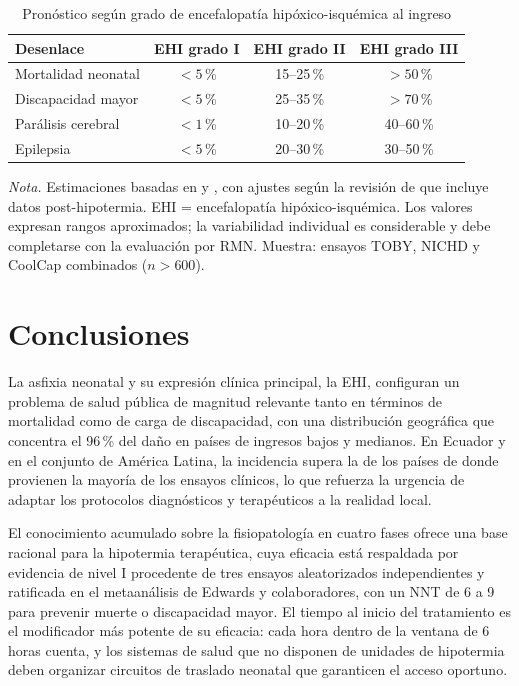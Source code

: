 \documentclass[12pt]{article}
\begin{document}
\begin{table}[ht]
\centering
\begin{threeparttable}
\caption{Pronóstico según grado de encefalopatía hipóxico-isquémica al ingreso}
\label{tab:pronostico}
\begin{tabular}{lccc}
\toprule
\textbf{Desenlace} & \textbf{EHI grado I} & \textbf{EHI grado II} & \textbf{EHI grado III} \\
\midrule
Mortalidad neonatal & $< 5$\,\% & 15--25\,\% & $> 50$\,\% \\
Discapacidad mayor & $< 5$\,\% & 25--35\,\% & $> 70$\,\% \\
Parálisis cerebral & $< 1$\,\% & 10--20\,\% & 40--60\,\% \\
Epilepsia & $< 5$\,\% & 20--30\,\% & 30--50\,\% \\
\bottomrule
\end{tabular}
\begin{tablenotes}
\small
\item \textit{Nota.} Estimaciones basadas en \citet{sarnat1976} y \citet{kurinczuk2010},
con ajustes según la revisión de \citet{edwards2010} que incluye datos post-hipotermia.
EHI = encefalopatía hipóxico-isquémica. Los valores expresan rangos aproximados;
la variabilidad individual es considerable y debe completarse con la evaluación
por RMN. Muestra: ensayos TOBY, NICHD y CoolCap combinados ($n > 600$).
\end{tablenotes}
\end{threeparttable}
\end{table}

\section{Conclusiones}
\label{sec:conclusiones}

La asfixia neonatal y su expresión clínica principal, la EHI, configuran un problema
de salud pública de magnitud relevante tanto en términos de mortalidad como de carga
de discapacidad, con una distribución geográfica que concentra el 96\,\% del daño en
países de ingresos bajos y medianos. En Ecuador y en el conjunto de América Latina,
la incidencia supera la de los países de donde provienen la mayoría de los ensayos
clínicos, lo que refuerza la urgencia de adaptar los protocolos diagnósticos y
terapéuticos a la realidad local.

El conocimiento acumulado sobre la fisiopatología en cuatro fases ofrece una base
racional para la hipotermia terapéutica, cuya eficacia está respaldada por evidencia
de nivel I procedente de tres ensayos aleatorizados independientes y ratificada en el
metaanálisis de Edwards y colaboradores, con un NNT de 6 a 9 para prevenir muerte o
discapacidad mayor. El tiempo al inicio del tratamiento es el modificador más potente
de su eficacia: cada hora dentro de la ventana de 6 horas cuenta, y los sistemas de
salud que no disponen de unidades de hipotermia deben organizar circuitos de traslado
neonatal que garanticen el acceso oportuno.
\end{document}
